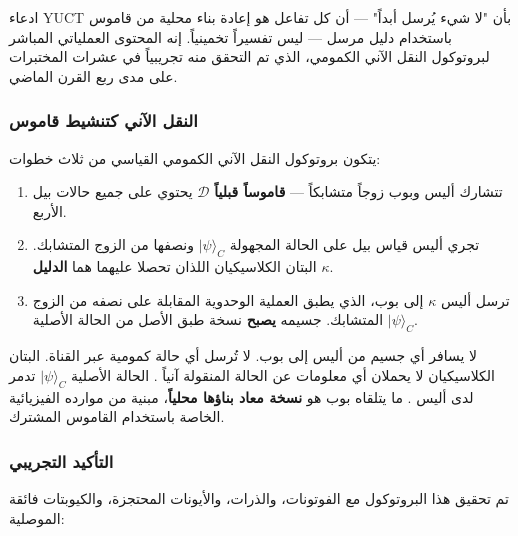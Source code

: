 \documentclass[12pt,a4paper]{article}
\theoremstyle{remark}
\begin{document}
	ادعاء YUCT بأن "لا شيء يُرسل أبداً" — أن كل تفاعل هو إعادة بناء محلية من قاموس باستخدام دليل مرسل — ليس تفسيراً تخمينياً. إنه المحتوى العملياتي المباشر لبروتوكول النقل الآني الكمومي، الذي تم التحقق منه تجريبياً في عشرات المختبرات على مدى ربع القرن الماضي.
	
	\subsubsection{النقل الآني كتنشيط قاموس}
	
	يتكون بروتوكول النقل الآني الكمومي القياسي \cite{Bennett1993} من ثلاث خطوات:
	\begin{enumerate}
		\item تتشارك أليس وبوب زوجاً متشابكاً — \textbf{قاموساً قبلياً} \(\mathcal{D}\) يحتوي على جميع حالات بيل الأربع.
		\item تجري أليس قياس بيل على الحالة المجهولة \(|\psi\rangle_C\) ونصفها من الزوج المتشابك. البتان الكلاسيكيان اللذان تحصلا عليهما هما \textbf{الدليل} \(\kappa\).
		\item ترسل أليس \(\kappa\) إلى بوب، الذي يطبق العملية الوحدوية المقابلة على نصفه من الزوج المتشابك. جسيمه \textbf{يصبح} نسخة طبق الأصل من الحالة الأصلية \(|\psi\rangle_C\).
	\end{enumerate}
	
	لا يسافر أي جسيم من أليس إلى بوب. لا تُرسل أي حالة كمومية عبر القناة. البتان الكلاسيكيان لا يحملان أي معلومات عن الحالة المنقولة آنياً \cite{Pirandola2017}. الحالة الأصلية \(|\psi\rangle_C\) تدمر لدى أليس \cite{Wootters1982}. ما يتلقاه بوب هو \textbf{نسخة معاد بناؤها محلياً}، مبنية من موارده الفيزيائية الخاصة باستخدام القاموس المشترك.
	
	\subsubsection{التأكيد التجريبي}
	
	تم تحقيق هذا البروتوكول مع الفوتونات، والذرات، والأيونات المحتجزة، والكيوبتات فائقة الموصلية:
	
\end{document}
